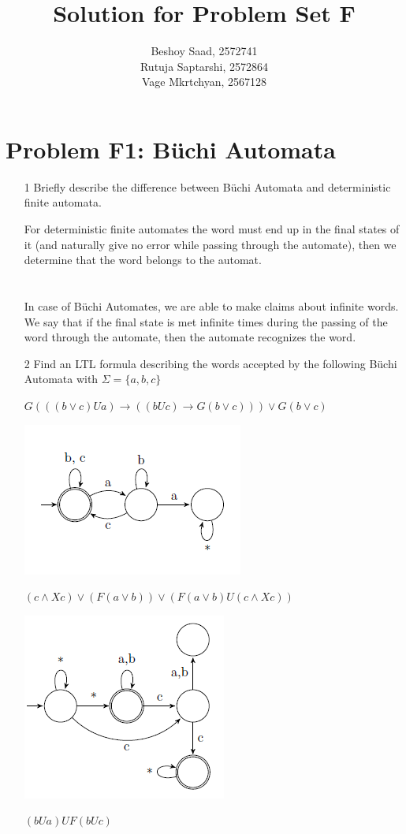\documentclass[]{article}
\title{Solution for Problem Set F}
\author{
	Beshoy Saad, 2572741\\
	Rutuja Saptarshi, 2572864\\
	Vage Mkrtchyan, 2567128
}
\begin{document}
	
	\maketitle
	\section{Problem F1: B\"uchi Automata}
	\begin{itemize}
		\item [1] Briefly describe the difference between B\"uchi Automata and deterministic finite automata.
		
		For deterministic finite automates the word must end up in the final states of it (and naturally give no error while passing through the automate), then we determine that the word belongs to the automat. 
		\\
		\\
		\\
		In case of B\"uchi Automates, we are able to make claims about infinite words. We say that if the final state is met infinite times during the passing of the word through the automate, then the automate recognizes the word.
		
		\item [2] Find an LTL formula describing the words accepted by the following Büchi Automata with $\Sigma = \{a, b, c\}$ \\
		\begin{center}
			$G(((b \vee  c)Ua) \rightarrow ((bUc) \rightarrow G(b \vee  c))) \vee  G(b \vee c)$	
		\end{center}
		\includegraphics[scale=1]{A1.PNG}
		\begin{center}
			$(c \wedge  Xc) \vee (F(a \vee b)) \vee (F(a \vee b)U(c \wedge  Xc))$	
		\end{center}
		\includegraphics[scale=1]{A2.PNG}
		\begin{center}
			$(bUa)UF(bUc)$	
		\end{center}
		

\end{itemize}
\end{document}
